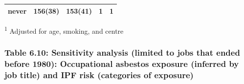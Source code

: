 \begin{longtable}[]{@{}lllll@{}}
\begin{minipage}[t]{0.06\columnwidth}
never\strut
\end{minipage} & \begin{minipage}[t]{0.10\columnwidth}\raggedright
156(38)\strut
\end{minipage} & \begin{minipage}[t]{0.12\columnwidth}\raggedright
153(41)\strut
\end{minipage} & \begin{minipage}[t]{0.29\columnwidth}\raggedright
1\strut
\end{minipage} & \begin{minipage}[t]{0.28\columnwidth}\raggedright
1\strut
\end{minipage}\tabularnewline
\bottomrule
\end{longtable}

\textsuperscript{1} Adjusted for age, smoking, and centre

\hypertarget{table-6.10-sensitivity-analysis-limited-to-jobs-that-ended-before-1980-occupational-asbestos-exposure-inferred-by-job-title-and-ipf-risk-categories-of-exposure}{%
\subsubsection{Table 6.10: Sensitivity analysis (limited to jobs that
ended before 1980): Occupational asbestos exposure (inferred by job
title) and IPF risk (categories of
exposure)}\label{table-6.10-sensitivity-analysis-limited-to-jobs-that-ended-before-1980-occupational-asbestos-exposure-inferred-by-job-title-and-ipf-risk-categories-of-exposure}}

